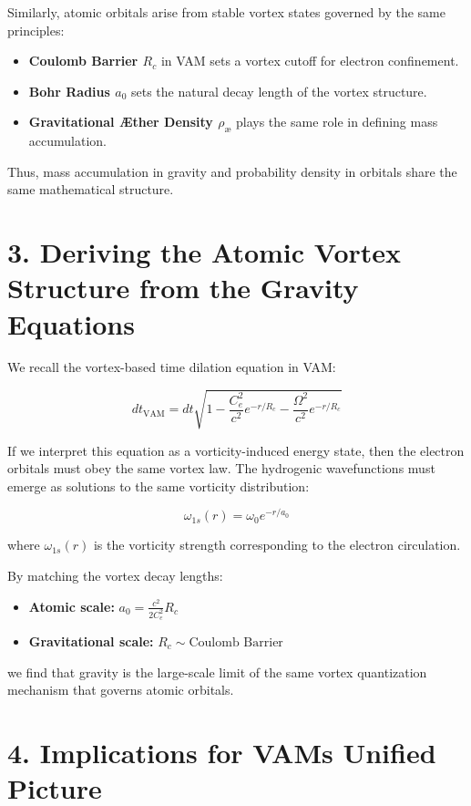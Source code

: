 Similarly, atomic orbitals arise from stable vortex states governed by the same principles:

\begin{itemize}
    \item \textbf{Coulomb Barrier \(R_c\)} in VAM sets a vortex cutoff for electron confinement.
    \item \textbf{Bohr Radius \(a_0\)} sets the natural decay length of the vortex structure.
    \item \textbf{Gravitational Æther Density \(\rho_\text{\ae}\)} plays the same role in defining mass accumulation.
\end{itemize}

Thus, mass accumulation in gravity and probability density in orbitals share the same mathematical structure.

\section*{3. Deriving the Atomic Vortex Structure from the Gravity Equations}

We recall the vortex-based time dilation equation in VAM:

\[
dt_\text{VAM} = dt \sqrt{1 - \frac{C_e^2}{c^2} e^{-r/R_c} - \frac{\Omega^2}{c^2} e^{-r/R_c}}
\]

If we interpret this equation as a vorticity-induced energy state, then the electron orbitals must obey the same vortex law. The hydrogenic wavefunctions must emerge as solutions to the same vorticity distribution:

\[
\omega_{1s}(r) = \omega_0 e^{-r/a_0}
\]

where \(\omega_{1s}(r)\) is the vorticity strength corresponding to the electron circulation.

By matching the vortex decay lengths:

\begin{itemize}
    \item \textbf{Atomic scale:} \(a_0 = \frac{c^2}{2C_e^2} R_c\)
    \item \textbf{Gravitational scale:} \(R_c \sim \text{Coulomb Barrier}\)
\end{itemize}

we find that gravity is the large-scale limit of the same vortex quantization mechanism that governs atomic orbitals.

\section*{4. Implications for VAM\rqs s Unified Picture}

